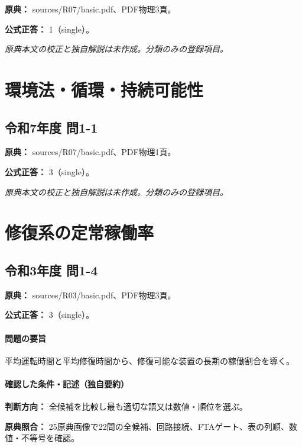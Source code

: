 \noindent\textbf{原典：} sources/R07/basic.pdf、PDF物理3頁。

\textbf{公式正答：} 1（single）。

\par\textit{原典本文の校正と独自解説は未作成。分類のみの登録項目。}

\section{環境法・循環・持続可能性}

\subsection{令和7年度 問1-1}
\label{q:r07-reg-basic-1-1}

\noindent\textbf{原典：} sources/R07/basic.pdf、PDF物理1頁。

\textbf{公式正答：} 3（single）。

\par\textit{原典本文の校正と独自解説は未作成。分類のみの登録項目。}

\section{修復系の定常稼働率}

\subsection{令和3年度 問1-4}
\label{q:r03-reg-basic-1-4}

\noindent\textbf{原典：} sources/R03/basic.pdf、PDF物理3頁。

\textbf{公式正答：} 3（single）。

\paragraph{問題の要旨} 平均運転時間と平均修復時間から、修復可能な装置の長期の稼働割合を導く。

\paragraph{確認した条件・記述（独自要約）}\mbox{}\par

\noindent\textbf{判断方向：} 全候補を比較し最も適切な語又は数値・順位を選ぶ。\par

\noindent\textbf{原典照合：} 25原典画像で22問の全候補、回路接続、FTAゲート、表の列順、数値・不等号を確認。\par

